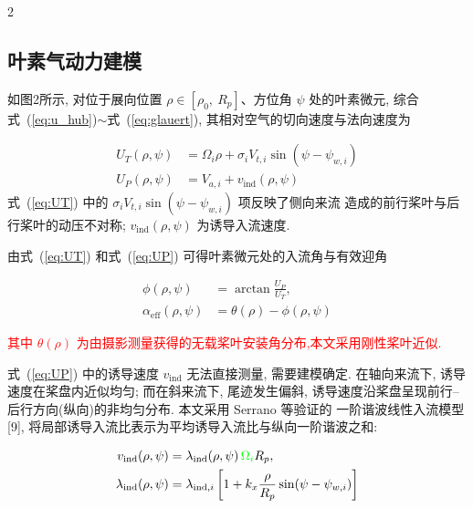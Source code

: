 \documentclass{aas}
\begin{document}
\begin{multicols}{2}%
\subsection{叶素气动力建模}
\label{subsec:rotation}
\label{subsec:blade_element}

如图2所示, 对位于展向位置 $\rho\in[\rho_0,\ R_p]$、方位角 $\psi$ 处的叶素微元, 综合
式~(\ref{eq:u_hub})$\sim$式~(\ref{eq:glauert}), 其相对空气的切向速度与法向速度为

\begin{align}
U_T(\rho,\psi)&=\Omega_i\rho+\sigma_i V_{t,i}\sin\!\left(\psi-\psi_{w,i}\right) \label{eq:UT}\\[2pt]
U_P(\rho,\psi)&=V_{a,i}+v_{\mathrm{ind}}(\rho,\psi) \label{eq:UP}
\end{align}
式~(\ref{eq:UT}) 中的 $\sigma_i V_{t,i}\sin(\psi-\psi_{w,i})$ 项反映了侧向来流
造成的前行桨叶与后行桨叶的动压不对称; $v_{\mathrm{ind}}(\rho,\psi)$
为诱导入流速度.

由式~(\ref{eq:UT}) 和式~(\ref{eq:UP}) 可得叶素微元处的入流角与有效迎角

\begin{equation}
\begin{aligned}
\phi(\rho,\psi)&=\arctan\frac{U_P}{U_T},\\
\alpha_{\mathrm{eff}}(\rho,\psi)&=\theta(\rho)-\phi(\rho,\psi)
\end{aligned}
\label{eq:aoa}
\end{equation}

\textcolor{red}{其中 $\theta(\rho)$ 为由摄影测量获得的无载桨叶安装角分布,本文采用刚性桨叶近似. }

\label{subsec:induced}

式~(\ref{eq:UP}) 中的诱导速度 $v_{\mathrm{ind}}$ 无法直接测量, 需要建模确定.
在轴向来流下, 诱导速度在桨盘内近似均匀; 而在斜来流下, 尾迹发生偏斜,
诱导速度沿桨盘呈现前行--后行方向(纵向)的非均匀分布. 本文采用 Serrano 等验证的
一阶谐波线性入流模型[9], 将局部诱导入流比表示为平均诱导入流比与纵向一阶谐波之和:

\begin{equation}
\begin{aligned}
v_{\mathrm{ind}}(\rho,\psi)&=\lambda_{\mathrm{ind}}(\rho,\psi)\,\textcolor{green}{\Omega_{i}}R_p,\\
\lambda_{\mathrm{ind}}(\rho,\psi)&=\lambda_{\mathrm{ind},i}\left[1+k_x\frac{\rho}{R_p}\sin\!\left(\psi-\psi_{w,i}\right)\right]
\end{aligned}
\label{eq:ind_vel}
\end{equation}


\end{multicols}
\end{document}
